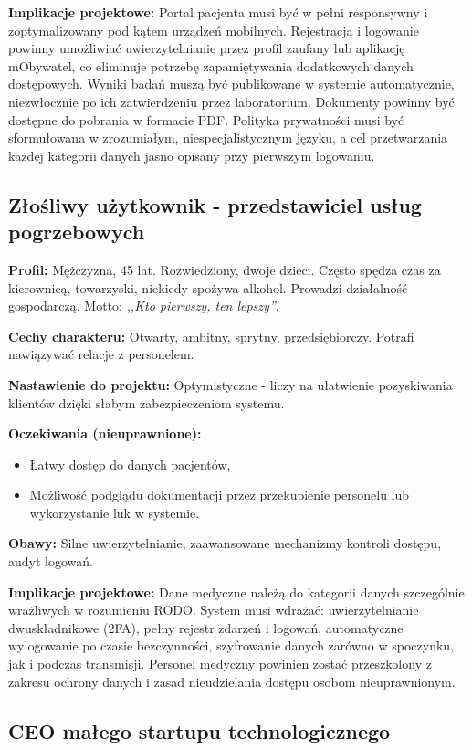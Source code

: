 \textbf{Implikacje projektowe:} Portal pacjenta musi być w pełni responsywny i zoptymalizowany
pod kątem urządzeń mobilnych. Rejestracja i logowanie powinny umożliwiać uwierzytelnianie
przez profil zaufany lub aplikację mObywatel, co eliminuje potrzebę zapamiętywania
dodatkowych danych dostępowych. Wyniki badań muszą być publikowane w systemie
automatycznie, niezwłocznie po ich zatwierdzeniu przez laboratorium. Dokumenty powinny
być dostępne do pobrania w formacie PDF. Polityka prywatności musi być sformułowana
w zrozumiałym, niespecjalistycznym języku, a cel przetwarzania każdej kategorii danych jasno opisany przy pierwszym logowaniu.

\subsection{Złośliwy użytkownik - przedstawiciel usług pogrzebowych}

\textbf{Profil:} Mężczyzna, 45 lat. Rozwiedziony, dwoje dzieci. Często spędza czas za kierownicą, towarzyski, niekiedy spożywa alkohol. Prowadzi działalność gospodarczą. Motto: \emph{,,Kto pierwszy, ten lepszy''}.

\textbf{Cechy charakteru:} Otwarty, ambitny, sprytny, przedsiębiorczy. Potrafi nawiązywać relacje z personelem.

\textbf{Nastawienie do projektu:} Optymistyczne - liczy na ułatwienie pozyskiwania klientów dzięki słabym zabezpieczeniom systemu.

\textbf{Oczekiwania (nieuprawnione):} 
\begin{itemize}
    \item Łatwy dostęp do danych pacjentów, 
    \item Możliwość podglądu dokumentacji przez przekupienie personelu lub wykorzystanie luk w systemie.
\end{itemize}

\textbf{Obawy:} Silne uwierzytelnianie, zaawansowane mechanizmy kontroli dostępu, audyt logowań.

\textbf{Implikacje projektowe:} Dane medyczne należą do kategorii danych szczególnie wrażliwych w rozumieniu RODO. System musi wdrażać: uwierzytelnianie dwuskładnikowe (2FA), pełny rejestr zdarzeń i logowań, automatyczne wylogowanie po czasie bezczynności, szyfrowanie danych zarówno w spoczynku, jak i podczas transmisji. Personel medyczny powinien zostać przeszkolony z zakresu ochrony danych i zasad nieudzielania dostępu osobom nieuprawnionym.

\subsection{CEO małego startupu technologicznego}

